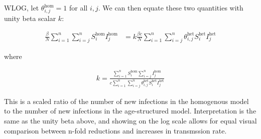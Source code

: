 \documentclass[12pt]{article}
\begin{document}
\noindent
WLOG, let $\theta^{\text{hom}}_{i,j} = 1$ for all $i,j$. We can then equate these two quantities with unity beta scalar $k$: 

\begin{align}
    \frac{\beta}{N}\sum_{i=1}^{n}\sum_{i=j}^{n} S^{\text{hom}}_i I^{\text{hom}}_j &= k\frac{\beta c}{N}\sum_{i=1}^{n}\sum_{i=j}^{n} \theta^{\text{het}}_{i,j} S^{\text{het}}_i I^{\text{het}}_j
\end{align}

\noindent
where

\begin{align}
    k = \frac{\sum_{i=1}^{n} S^{\text{hom}}_i  \sum_{i=j}^{n} I^{\text{hom}}_j}{c\sum_{i=1}^{n}\sum_{i=j}^{n} \theta^{\text{het}}_{i,j} S^{\text{het}}_i I^{\text{het}}_j}
\end{align}

This is a scaled ratio of the number of new infections in the homogenous model to the number of new infections in the age-structured model. Interpretation is the same as the unity beta above, and showing on the log scale allows for equal visual comparison between n-fold reductions and increases in transmssion rate.
\end{document}
